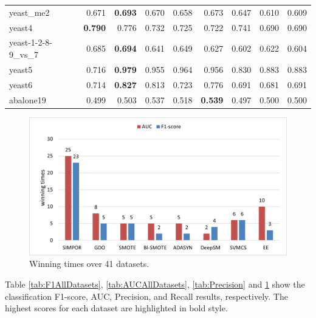 {\begin{table}[htbp]
{\begin{tabular}{lrrrrrrrr}
	       	yeast\_me2 & 0.671 & \textbf{0.693} & 0.670 & 0.658 & 0.673 & 0.647 & 0.610 & 0.609 \\
	       	yeast4 & \textbf{0.790} & 0.776 & 0.732 & 0.725 & 0.722 & 0.741 & 0.690 & 0.690 \\
	       	yeast-1-2-8-9\_vs\_7 & 0.685 & \textbf{0.694} & 0.641 & 0.649 & 0.627 & 0.602 & 0.622 & 0.604 \\
	       	yeast5 & 0.716 & \textbf{0.979} & 0.955 & 0.964 & 0.956 & 0.830 & 0.883 & 0.883 \\
	       	yeast6 & 0.714 & \textbf{0.827} & 0.813 & 0.723 & 0.776 & 0.691 & 0.681 & 0.691 \\
	       	abalone19 & 0.499 & 0.503 & 0.537 & 0.518 & \textbf{0.539} & 0.497 & 0.500 & 0.500 \\
	       	\bottomrule
	       \end{tabular}%
		
	}
	\label{tab:Recall}%
\end{table}%
}

\begin{figure}[h!]
	\centering
	\includegraphics[width=\linewidth ]{Figures/winning_times}
	\caption{Winning times over 41 datasets.}
	\label{fig:winingTimes}
\end{figure}

Table \ref{tab:F1AllDatasets}, \ref{tab:AUCAllDatasets}, \ref{tab:Precision} and \ref{tab:Recall} show the classification F1-score, AUC, Precision, and Recall results, respectively. The highest scores for each dataset are highlighted in bold style. 

